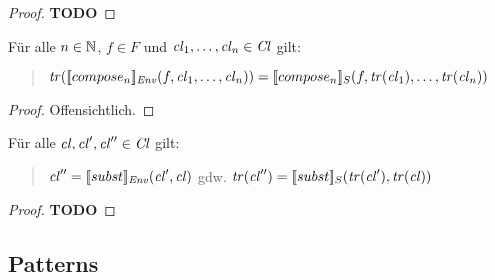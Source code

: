 \documentclass[12pt,a4paper,draft]{article}
\begin{document}
\begin{proof}
  \textbf{TODO}
\end{proof}

\begin{lemma}
  F\"ur alle $n \in \mathbb N$, $f \in F$ und $\mathit{cl}_1,\ldots,\mathit{cl}_n \in \mathit{Cl}$ gilt:
  \begin{quote}
    $\mathit{tr}([\![compose_n]\!]_{\mathit{Env}}(f,\mathit{cl}_1,\ldots,\mathit{cl}_n)) = [\![compose_n]\!]_S(f,\mathit{tr}(\mathit{cl}_1),\ldots,\mathit{tr}(\mathit{cl}_n))$
  \end{quote}
\end{lemma}

\begin{proof}
  Offensichtlich.
\end{proof}

\begin{lemma}
  F\"ur alle $\mathit{cl},\mathit{cl}',\mathit{cl}''\in\mathit{Cl}$ gilt:
  \begin{quote}
    $\mathit{cl}'' = [\![subst]\!]_{\mathit{Env}}(\mathit{cl}',\mathit{cl})$ gdw. $\mathit{tr}(\mathit{cl}'') = [\![subst]\!]_S(\mathit{tr}(\mathit{cl}'),\mathit{tr}(\mathit{cl}))$
  \end{quote}
\end{lemma}

\begin{proof}
  \textbf{TODO}
\end{proof}


\subsection*{Patterns}
\end{document}
